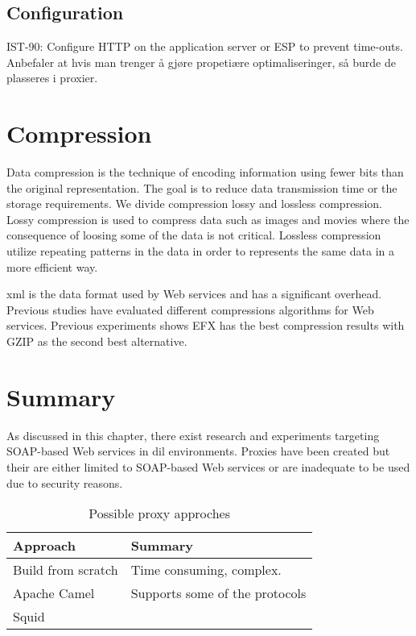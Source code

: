 \subsection{Configuration}
IST-90: Configure HTTP on the application server or ESP to prevent time-outs.
Anbefaler at hvis man trenger å gjøre propetiære optimaliseringer, så burde de
plasseres i proxier.



\section{Compression}

Data compression is the technique of encoding information using fewer bits than
the original representation. The goal is to reduce data transmission time or the
storage requirements. We divide compression lossy and lossless compression.
Lossy compression is used to compress data such as images and movies where the
consequence of loosing some of the data is not critical. Lossless compression
utilize repeating patterns in the  data in order to represents the same data in
a more efficient way.

\gls{xml} is the data format used by Web services and has a significant
overhead. Previous studies have evaluated different compressions algorithms for
Web services. Previous experiments shows EFX has the best compression results with
GZIP as the second best alternative\cite{johnsen-trude-compression-techniqes}.


\section{Summary}

As discussed in this chapter, there exist research and experiments targeting
SOAP-based Web services in \gls{dil} environments. Proxies have been created but
their are either limited to SOAP-based Web services or are inadequate to be used
due to security reasons.

\begin{table}
    \begin{tabular}{|l|l|}
    \hline
    \textbf{Approach}          & \textbf{Summary}     \\ \hline
    Build from scratch & Time consuming, complex.       \\ \hline
    Apache Camel      & Supports some of the protocols \\ \hline
    Squid      & \\ \hline
    \end{tabular}
    \caption {Possible proxy approches}
\end{table}
